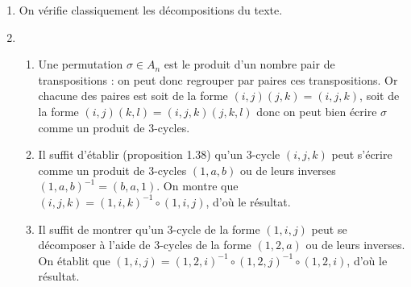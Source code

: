 
\begin{enumerate}

 \item On vérifie classiquement les décompositions du texte.

 \item \begin{enumerate}

 \item Une permutation $\sigma \in A_n$ est le produit d'un nombre pair de transpositions : on peut donc regrouper par paires ces transpositions. Or chacune des paires est soit de la forme $(i,j)(j,k) = (i,j,k)$, soit de la forme $(i,j)(k,l)=(i,j,k)(j,k,l)$ donc on peut bien écrire $\sigma$ comme un produit de 3-cycles.
 \item Il suffit d'établir (proposition 1.38) qu'un 3-cycle $(i,j,k)$ peut s'écrire comme un produit de 3-cycles $(1,a,b)$ ou de leurs inverses $(1,a,b)^{-1} = (b,a,1)$. On montre que $(i,j,k) = (1,i,k)^{-1}\circ (1,i,j)$, d'où le résultat.
 \item Il suffit de montrer qu'un 3-cycle de la forme $(1,i,j)$ peut se décomposer à l'aide de 3-cycles de la forme $(1,2,a)$ ou de leurs inverses. On établit que $(1,i,j) = (1,2,i)^{-1}\circ (1,2,j)^{-1}\circ (1,2,i)$, d'où le résultat.
\end{enumerate}
\end{enumerate}

